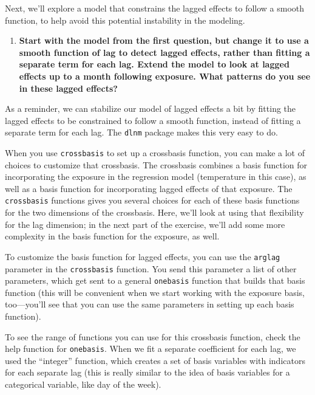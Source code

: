 \documentclass[
]{book}
\providecommand{\tightlist}{%
  \setlength{\itemsep}{0pt}\setlength{\parskip}{0pt}}
\begin{document}
Next, we'll explore a model that constrains the lagged effects to follow a smooth
function, to help avoid this potential instability in the modeling.

\begin{enumerate}
\def\labelenumi{\arabic{enumi}.}
\setcounter{enumi}{1}
\tightlist
\item
  \textbf{Start with the model from the first question, but change it to use a smooth
  function of lag to detect lagged effects, rather than fitting a separate term
  for each lag. Extend the model to look at lagged effects up to a month following
  exposure. What patterns do you see in these lagged effects?}
\end{enumerate}

As a reminder, we can stabilize our model of lagged effects a bit by fitting the
lagged effects to be constrained to follow a smooth function, instead of fitting a separate
term for each lag. The \texttt{dlnm} package makes this very easy to do.

When you use \texttt{crossbasis} to set up a crossbasis function, you can make a lot of choices
to customize that crossbasis. The crossbasis combines a basis function for incorporating
the exposure in the regression model (temperature in this case), as well as a basis function
for incorporating lagged effects of that exposure. The \texttt{crossbasis} functions gives you
several choices for each of these basis functions for the two dimensions of the
crossbasis. Here, we'll look at using that flexibility for the lag dimension; in the next
part of the exercise, we'll add some more complexity in the basis function for the
exposure, as well.

To customize the basis function for lagged effects, you can use the \texttt{arglag} parameter
in the \texttt{crossbasis} function. You send this parameter a list of other parameters, which
get sent to a general \texttt{onebasis} function that builds that basis function (this will
be convenient when we start working with the exposure basis, too---you'll see that you
can use the same parameters in setting up each basis function).

To see the range of functions you can use for this crossbasis function, check the help
function for \texttt{onebasis}. When we fit a separate coefficient for each lag, we used the
``integer'' function, which creates a set of basis variables with indicators for each
separate lag (this is really similar to the idea of basis variables for a categorical
variable, like day of the week).
\end{document}
